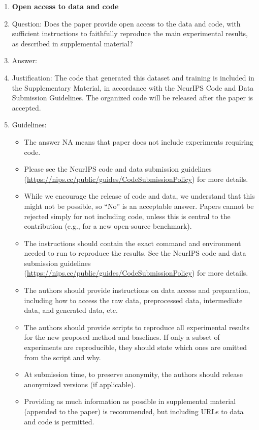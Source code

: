 \documentclass{article}
\begin{document}
\begin{enumerate}
\item {\bf Open access to data and code}
    \item[] Question: Does the paper provide open access to the data and code, with sufficient instructions to faithfully reproduce the main experimental results, as described in supplemental material?
    \item[] Answer: \answerYes{} %
    \item[] Justification: The code that generated this dataset and training is included in the Supplementary Material, in accordance with the NeurIPS Code and Data Submission Guidelines. The organized code will be released after the paper is accepted.
    \item[] Guidelines:
    \begin{itemize}
        \item The answer NA means that paper does not include experiments requiring code.
        \item Please see the NeurIPS code and data submission guidelines (\url{https://nips.cc/public/guides/CodeSubmissionPolicy}) for more details.
        \item While we encourage the release of code and data, we understand that this might not be possible, so “No” is an acceptable answer. Papers cannot be rejected simply for not including code, unless this is central to the contribution (e.g., for a new open-source benchmark).
        \item The instructions should contain the exact command and environment needed to run to reproduce the results. See the NeurIPS code and data submission guidelines (\url{https://nips.cc/public/guides/CodeSubmissionPolicy}) for more details.
        \item The authors should provide instructions on data access and preparation, including how to access the raw data, preprocessed data, intermediate data, and generated data, etc.
        \item The authors should provide scripts to reproduce all experimental results for the new proposed method and baselines. If only a subset of experiments are reproducible, they should state which ones are omitted from the script and why.
        \item At submission time, to preserve anonymity, the authors should release anonymized versions (if applicable).
        \item Providing as much information as possible in supplemental material (appended to the paper) is recommended, but including URLs to data and code is permitted.
    \end{itemize}


\end{enumerate}
\end{document}

